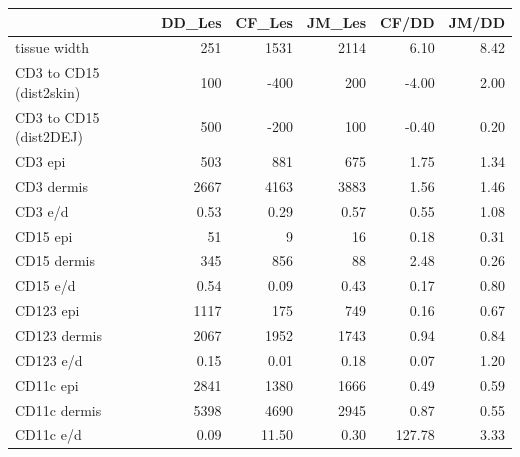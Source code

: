 \begin{tabular}{lrrrrr}
   \hline  &DD\_Les& CF\_Les& JM\_Les& CF/DD& JM/DD\\ 
\hline
tissue width & 251 & 1531 & 2114 &   6.10 & 8.42 \\ 
  CD3 to CD15 (dist2skin) & 100 & -400 & 200 &  -4.00 & 2.00 \\ 
  CD3 to CD15 (dist2DEJ) & 500 & -200 & 100 &  -0.40 & 0.20 \\ 
   \hline
CD3 epi & 503 & 881 & 675 &   1.75 & 1.34 \\ 
  CD3 dermis & 2667 & 4163 & 3883 &   1.56 & 1.46 \\ 
  CD3 e/d & 0.53 &  0.29 & 0.57 &   0.55 & 1.08 \\ 
   \hline
CD15 epi & 51 & 9 & 16 &   0.18 & 0.31 \\ 
  CD15 dermis & 345 & 856 & 88 &   2.48 & 0.26 \\ 
  CD15 e/d & 0.54 &  0.09 & 0.43 &   0.17 & 0.80 \\ 
   \hline
CD123 epi & 1117 & 175 & 749 &   0.16 & 0.67 \\ 
  CD123 dermis & 2067 & 1952 & 1743 &   0.94 & 0.84 \\ 
  CD123 e/d & 0.15 &  0.01 & 0.18 &   0.07 & 1.20 \\ 
   \hline
CD11c epi & 2841 & 1380 & 1666 &   0.49 & 0.59 \\ 
  CD11c dermis & 5398 & 4690 & 2945 &   0.87 & 0.55 \\ 
  CD11c e/d & 0.09 & 11.50 & 0.30 & 127.78 & 3.33 \\ 
   \hline
\end{tabular}
